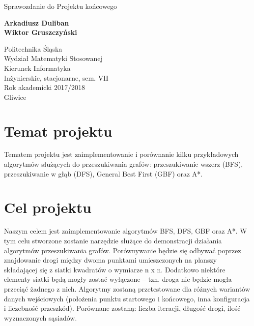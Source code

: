 \documentclass{article}
\begin{document}
\begin{titlepage}
    \begin{center}
        \vspace*{1cm}
        
        \Huge{Sprawozdanie do Projektu końcowego}
        
        
        \vspace{1.5cm}
        
        \large \textbf{Arkadiusz Duliban} \\
        \large \textbf{Wiktor Gruszczyński}
        
        \vfill
        
        
        \vspace{0.8cm}
        

        
        Politechnika Śląska\\
        Wydział Matematyki Stosowanej\\
        Kierunek Informatyka\\
        Inżynierskie, stacjonarne, sem. VII\\
        Rok akademicki 2017/2018
\\
        Gliwice
        
    \end{center}
\end{titlepage}

\newpage

\tableofcontents

\newpage

\vspace*{1in}

\section{Temat projektu}
Tematem projektu jest zaimplementowanie i porównanie kilku przykładowych algorytmów służących do przeszukiwania grafów: przeszukiwanie wszerz (BFS), przeszukiwanie w głąb (DFS), General Best First (GBF) oraz A*. 
\section{Cel projektu}
Naszym celem jest zaimplementowanie algorytmów BFS, DFS, GBF oraz A*. W tym celu stworzone zostanie narzędzie służące do demonstracji działania algorytmów przeszukiwania grafów. Porównywanie będzie się odbywać poprzez znajdowanie drogi między dwoma punktami umieszczonych na planszy składającej się z siatki kwadratów o wymiarze n x n. Dodatkowo niektóre elementy siatki będą mogły zostać wyłączone – tzn. droga nie będzie mogła przeciąć żadnego z nich. 
Algorytmy zostaną przetestowane dla różnych wariantów danych wejściowych (położenia punktu startowego i końcowego,  inna konfiguracja i liczebność przeszkód). Porównane zostaną: liczba iteracji, długość drogi, ilość wyznaczonych sąsiadów.
\end{document}
